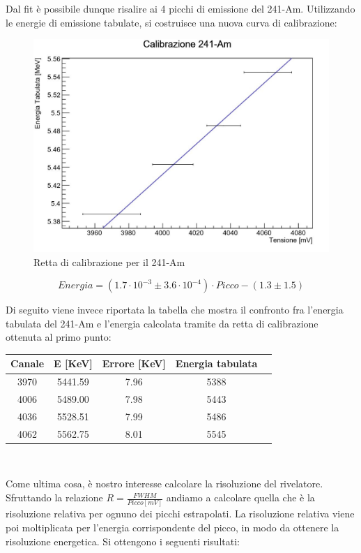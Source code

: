 \documentclass[a4paper,10pt]{article}
\begin{document}
Dal fit \`e possibile dunque risalire ai 4 picchi di emissione del 241-Am. Utilizzando le energie di emissione tabulate, si costruisce una nuova curva di calibrazione:\\

\begin{figure}[H]
\centering
\includegraphics[scale=0.5]{rettaame.jpg}
\caption{Retta di calibrazione per il 241-Am}
\end{figure}
\[
Energia = (1.7\cdot10^{-3} \pm 3.6\cdot10^{-4})\cdot Picco - (1.3 \pm 1.5)
\]

Di seguito viene invece riportata la tabella che mostra il confronto fra l'energia tabulata del 241-Am e l'energia calcolata tramite da retta di calibrazione ottenuta al primo punto:

\begin{center}
\begin{tabular}{ccccc}
\toprule
Canale & E [KeV] & Errore [KeV] & Energia tabulata\\
\midrule
3970 & 5441.59 & 7.96 & 5388\\
4006 & 5489.00 & 7.98 & 5443\\
4036 & 5528.51 & 7.99 & 5486\\
4062 & 5562.75 & 8.01 & 5545\\
\bottomrule
\end{tabular}\\
\end{center}

Come ultima cosa, \`e nostro interesse calcolare la risoluzione del rivelatore. Sfruttando la relazione $R=\frac{FWHM}{Picco[mV]}$ andiamo a calcolare quella che è la risoluzione relativa per ognuno dei picchi estrapolati. La risoluzione relativa viene poi moltiplicata per l'energia corrispondente del picco, in modo da ottenere la risoluzione energetica. Si ottengono i seguenti risultati:
\end{document}
